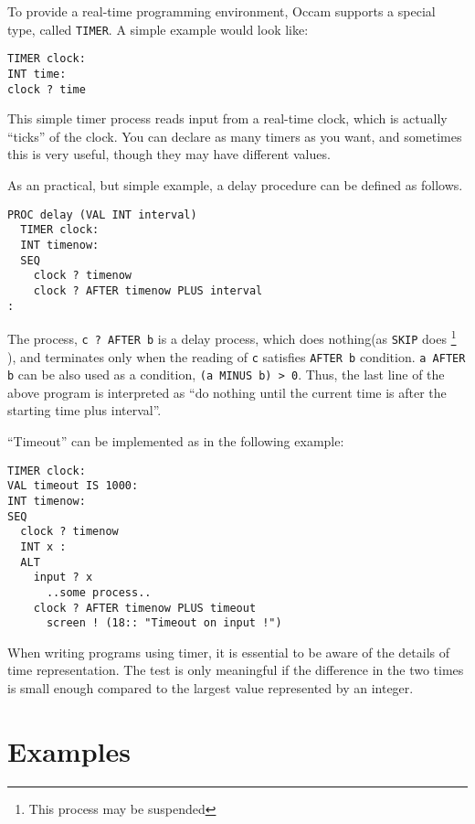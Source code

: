 
To provide a real-time programming environment, Occam supports a
special type, called {\tt TIMER}.  A simple example would look like:
\begin{lin}
\begin{verbatim}
TIMER clock:
INT time:
clock ? time
\end{verbatim}
\end{lin}
This simple timer process reads input from a real-time clock, which is
actually ``ticks'' of the clock.   You can declare as many timers as
you want, and sometimes this is very useful, though they may have
different values.

As an practical, but simple example,  a delay procedure can be defined
as follows.
\begin{lin}
\begin{verbatim}
PROC delay (VAL INT interval)
  TIMER clock:
  INT timenow:
  SEQ
    clock ? timenow
    clock ? AFTER timenow PLUS interval
:
\end{verbatim}
\end{lin}
The process, {\tt c ? AFTER b} is a delay process, which does
nothing(as {\tt SKIP} does
\footnote{This process may be suspended}
), and terminates only when
the reading of {\tt c} satisfies {\tt AFTER b} condition.
{\tt a AFTER b} can be also used as a condition, {\tt (a MINUS b) >
0}.  Thus, the last line of the above program is interpreted as
``do nothing until the current time is after the starting time plus
interval''. 

``Timeout'' can be implemented as in the following example:
\begin{lin}
\begin{verbatim}
TIMER clock:
VAL timeout IS 1000:
INT timenow:
SEQ
  clock ? timenow
  INT x :
  ALT
    input ? x
      ..some process..
    clock ? AFTER timenow PLUS timeout
      screen ! (18:: "Timeout on input !")
\end{verbatim}
\end{lin}

When writing programs using timer, it is essential to be aware of the
details of time representation.  The test is only meaningful if the
difference in the two times is small enough compared to the largest value
represented by an integer.

\section{Examples}

